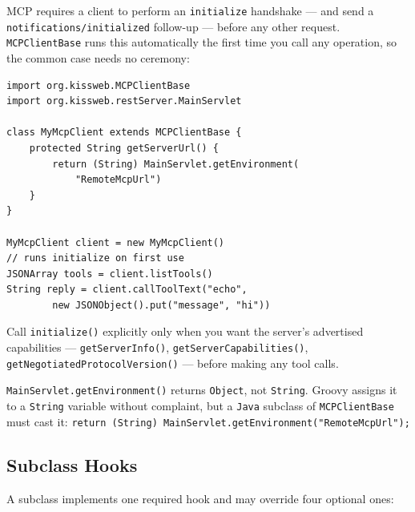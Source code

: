 MCP requires a client to perform an \texttt{initialize} handshake --- and send a \texttt{notifications/initialized} follow-up --- before any other request.  \texttt{MCPClientBase} runs this automatically the first time you call any operation, so the common case needs no ceremony:

\begin{lstlisting}[style=groovy]
import org.kissweb.MCPClientBase
import org.kissweb.restServer.MainServlet

class MyMcpClient extends MCPClientBase {
    protected String getServerUrl() {
        return (String) MainServlet.getEnvironment(
            "RemoteMcpUrl")
    }
}

MyMcpClient client = new MyMcpClient()
// runs initialize on first use
JSONArray tools = client.listTools()
String reply = client.callToolText("echo",
        new JSONObject().put("message", "hi"))
\end{lstlisting}

\noindent
Call \texttt{initialize()} explicitly only when you want the server's advertised capabilities --- \texttt{getServerInfo()}, \texttt{getServerCapabilities()}, \texttt{getNegotiatedProtocolVersion()} --- before making any tool calls.

\begin{tipbox}
\texttt{MainServlet.getEnvironment()} returns \texttt{Object}, not \texttt{String}.  Groovy assigns it to a \texttt{String} variable without complaint, but a \texttt{Java} subclass of \texttt{MCPClientBase} must cast it: \texttt{return (String) MainServlet.getEnvironment("RemoteMcpUrl");}
\end{tipbox}

\subsection{Subclass Hooks}

A subclass implements one required hook and may override four optional ones:

